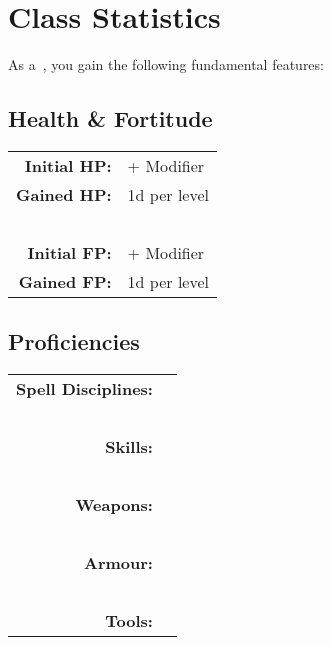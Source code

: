 {\begin{strip}
\begin{tcolorbox}
	     		{\large \begin{center} \bf \name \end{center}}
	     		\vspace{-1.3ex}
	     		
	     		\dndlineLong
	     	
	     			
				
		     		\if{}
						\if{}
							\tableLong
						\fi
						\if{}
							\if{}
								\extraTable
							\fi
							\if {}
								\doubleTable
							\fi
						\fi
					\fi
					\if{}
						\tableShort
					\fi
		
	     		
	     		\normalsize
	     		\dndlineLong
				
				
     	\end{tcolorbox}
		
		\if{}
		\end{strip}
		\fi
		
     	\section*{Class Statistics}
		
		As a\if{}\fi~\name{}, you gain the following fundamental features:
		
		\subsection{Health \& Fortitude}
		\def\w{6}
		\begin{tabular}{ r p{\w cm}}
			\bf Initial HP:	&	\hp{} + \attPhys{} Modifier
			\\
			\bf Gained HP:	&	1d\hp{} per \name{} level
			\\
			~
			\\
			\bf Initial FP:	&	\fp{} + \attInt{} Modifier
			\\
			\bf Gained FP:	&	1d\fp{} per \name{} level
		\end{tabular}

		
		\subsection{Proficiencies}
		\def\w{6}
		\begin{tabular}{ r p{\w cm}}
			\bf Spell Disciplines:	&	\disc
			\\
			~
			\\
			\bf Skills:	&	\prof
			\\
			~
			\\
			\bf Weapons:	&	\weapon
			\\
			~
			\\
			\bf Armour:	&	\armour 
			\\
			~
			\\
			\bf Tools:	&	\tool
		\end{tabular}
		
}
